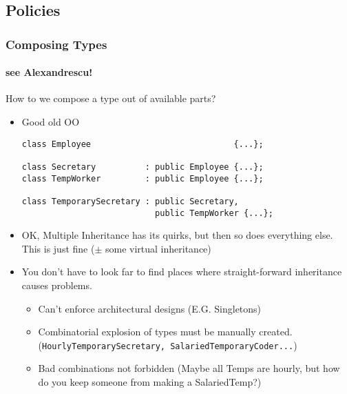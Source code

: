 \subsection{Policies}
\begin{frame}[fragile,t]
\frametitle{Composing Types}
\framesubtitle{see Alexandrescu!}
How to we compose a type out of available parts?
\pause
\begin{itemize}[<+->]
\item Good old OO
{\scriptsize
\begin{verbatim}
class Employee                             {...};

class Secretary          : public Employee {...};
class TempWorker         : public Employee {...};

class TemporarySecretary : public Secretary, 
                           public TempWorker {...};
\end{verbatim}
}
\item OK, Multiple Inheritance has its quirks, but then so does
  everything else.  This is just fine ($\pm$ some virtual inheritance)
\item You don't have to look far to find places where straight-forward
  inheritance causes problems.
\begin{itemize}
\item Can't enforce architectural designs (E.G. Singletons)
\item Combinatorial explosion of types must be manually
  created. (\texttt{HourlyTemporarySecretary, SalariedTemporaryCoder...}) 
\item Bad combinations not forbidden (Maybe all Temps are hourly,
  but how do you keep someone from making a SalariedTemp?)
\end{itemize}

\end{itemize}

\end{frame}

